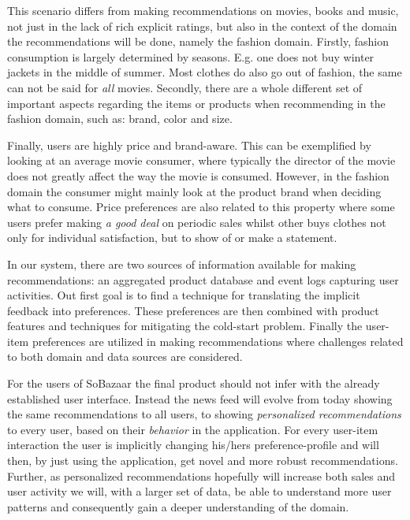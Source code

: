 This scenario differs from making recommendations on movies, books and music,
not just in the lack of rich explicit ratings, but also in the context of the
domain the recommendations will be done, namely the fashion domain. Firstly,
fashion consumption is largely determined by seasons. E.g. one does not buy
winter jackets in the middle of summer. Most clothes do also go out of
fashion, the same can not be said for \emph{all} movies. Secondly, there are a
whole different set of important aspects regarding the items or products when
recommending in the fashion domain, such as: brand, color and size.

Finally, users are highly price and brand-aware. This can be exemplified by
looking at an average movie consumer, where typically the director of the movie
does not greatly affect the way the movie is consumed. However, in the fashion
domain the consumer might mainly look at the product brand when deciding what
to consume. Price preferences are also related to this property where some
users prefer making \textit{a good deal} on periodic sales whilst other buys
clothes not only for individual satisfaction, but to show of or make a
statement.

In our system, there are two sources of information available for making
recommendations: an aggregated product database and event logs capturing user
activities. Out first goal is to find a technique for translating the implicit
feedback into preferences. These preferences are then combined with product
features and techniques for mitigating the cold-start problem. Finally the
user-item preferences are utilized in making recommendations where challenges
related to both domain and data sources are considered.

For the users of SoBazaar the final product should not infer with the already
established user interface. Instead the news feed will evolve from today
showing the same recommendations to all users, to showing \textit{personalized
recommendations} to every user, based on their \textit{behavior} in the
application. For every user-item interaction the user is implicitly changing
his/hers preference-profile and will then, by just using the application, get
novel and more robust recommendations. Further, as personalized recommendations
hopefully will increase both sales and user activity we will, with a larger set
of data, be able to understand more user patterns and consequently gain a
deeper understanding of the domain.

